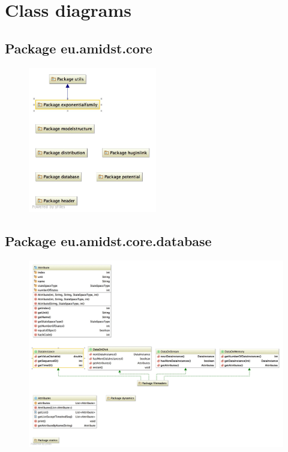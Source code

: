 \newpage
\section*{Class diagrams}
\label{sec:classDiagrams}

\subsection{Package eu.amidst.core}

\begin{figure}[H]
  \centering
    \includegraphics[width=0.5\textwidth]{ClassDiagrams/core.jpg}
\end{figure}

\subsection{Package eu.amidst.core.database}
\begin{figure}[H]
  \centering
    \includegraphics[width=\textwidth]{ClassDiagrams/core_database.jpg}
\end{figure}


